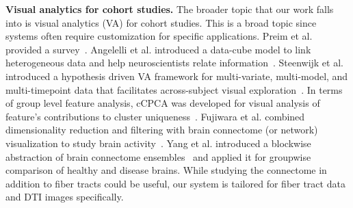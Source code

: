 \vspace{1pt}
\noindent\textbf{Visual analytics for cohort studies.}
The broader topic that our work falls into is visual analytics (VA) for cohort studies. This is a broad topic since systems often require customization for specific applications. Preim et al. provided a survey~\cite{doi:10.1111/cgf.13891}. Angelelli et al. introduced a data-cube model to link heterogeneous data and help neuroscientists relate information~\cite{angelelli2014interactive}. Steenwijk et al. introduced a hypothesis driven VA framework for multi-variate, multi-model, and multi-timepoint data that facilitates across-subject visual exploration~\cite{steenwijk2010integrated}. In terms of group level feature analysis, cCPCA 
was developed for visual analysis of feature's contributions to cluster uniqueness~\cite{8805461}.  
Fujiwara et al. combined dimensionality reduction and filtering with brain connectome (or network) visualization to study brain activity~\cite{fujiwara2017visual}. Yang et al. introduced a blockwise abstraction of brain connectome ensembles~\cite{yang2017blockwise} and applied it for groupwise comparison of healthy and disease brains. While studying the connectome in addition to fiber tracts could be useful, our system is tailored for fiber tract data and DTI images specifically.

